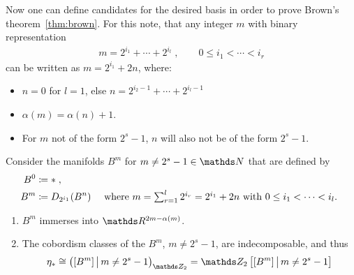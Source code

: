 Now one can define candidates for the desired basis in order to prove
Brown's theorem~\autoref{thm:brown}.
For this note, that any integer $m$ with binary representation
\begin{gather*}
  m=2^{i_1}+\dotsb+2^{i_l}
  \;,\qquad
  0 \leq i_1<\dotsb<i_r
\end{gather*}
can be written as $m=2^{i_1}+2n$, where:
\begin{itemize}
\item $n=0$ for $l=1$, else $n=2^{i_2-1}+\dotsb+2^{i_l-1}$
\item $\alpha(m)=\alpha(n)+1$.
\item For $m$ not of the form $2^s-1$, $n$ will also not be of the
  form $2^s-1$.
\end{itemize}
\begin{Thm}
  Consider the manifolds $B^m$ for $m\neq 2^s-1\in\Nat$ that are
  defined by
  \begin{align*}
    B^0 &\coloneqq * \;, \\
    B^m &\coloneqq D_{2^{i_1}}({B^n})
        &\text{
          where
          $\textstyle m=\sum_{r=1}^l 2^{i_r}=2^{i_1}+2n$
          with $0\leq i_1<\dotsb<i_l$.
          }
  \end{align*}
  \begin{enumerate}
  \item $B^m$ immerses into $\R^{2m-\alpha(m)}$.
  \item The cobordism classes of the $B^m$, $m\neq 2^s-1$, are
    indecomposable, and thus %
    \begin{gather*}
      \c_*\cong \left( [B^m] \,\big|\, m\neq 2^s-1 \right)_{\Zmod2}
      = \Zmod2\left[[B^m] \,\big|\, m\neq 2^s-1\right]
    \end{gather*}
  \end{enumerate}
\end{Thm}


